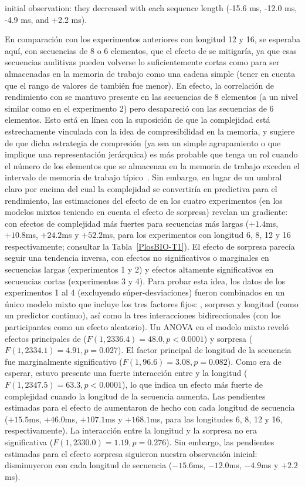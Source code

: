 initial observation: they decreased with each sequence length (-15.6 ms, -12.0 ms, -4.9 ms, and +2.2 ms).

En comparación con los experimentos anteriores con longitud 12 y 16, se esperaba aquí, con secuencias de 8 o 6 elementos, que el efecto de \mdlbin se mitigaría, ya que esas secuencias auditivas pueden volverse lo suficientemente cortas como para ser almacenadas en la memoria de trabajo como una cadena simple (tener en cuenta que el rango de valores de \mdlbin también fue menor). En efecto, la correlación de rendimiento con \mdlbin se mantuvo presente en las secuencias de 8 elementos (a un nivel similar como en el experimento 2) pero desapareció con las secuencias de 6 elementos. Esto está en línea con la suposición de que la complejidad está estrechamente vinculada con la idea de compresibilidad en la memoria, y sugiere de que dicha estrategia de compresión (ya sea un simple agrupamiento o que implique una representación jerárquica) es más probable que tenga un rol cuando el número de los elementos que se almacenan en la memoria de trabajo exceden el intervalo de memoria de trabajo típico~\cite{f16,f89}. Sin embargo, en lugar de un umbral claro por encima del cual la complejidad se convertiría en predictiva para el rendimiento, las estimaciones del efecto de \mdlbin en los cuatro experimentos (en los modelos mixtos teniendo en cuenta el efecto de sorpresa) revelan un gradiente: con efectos de complejidad más fuertes para secuencias más largas ($+1.4$ms, $+10.8$ms, $+24.2$ms y $+52.2$ms, para los experimentos con longitud 6, 8, 12 y 16 respectivamente; consultar la Tabla~\ref{PlosBIO-T1}). El efecto de sorpresa parecía seguir una tendencia inversa, con efectos no significativos o marginales en secuencias largas (experimentos 1 y 2) y efectos altamente significativos en secuencias cortas (experimentos 3 y 4). Para probar esta idea, los datos de los experimentos 1 al 4 (excluyendo súper-desviaciones) fueron combinados en un único modelo mixto que incluye los tres factores fijos: \mdlbin, sorpresa y longitud (como un predictor continuo), así como la tres interacciones bidireccionales (con los participantes como un efecto aleatorio). Un ANOVA en el modelo mixto reveló efectos principales de \mdlbin ($F (1, 2336.4) = 48.0, p < 0.0001$) y sorpresa ($F (1, 2334.1) = 4.91, p = 0.027$). El factor principal de longitud de la secuencia fue marginalmente significativo ($F (1, 96.6) = 3.08, p = 0.082$). Como era de esperar, estuvo presente una fuerte interacción entre \mdlbin y la longitud ($F (1, 2347.5) = 63.3, p < 0.0001$), lo que indica un efecto más fuerte de complejidad cuando la longitud de la secuencia aumenta. Las pendientes estimadas para el efecto de \mdlbin aumentaron de hecho con cada longitud de secuencia ($+15.5$ms, $+46.0$ms, $+107.1$ms y $+168.1$ms, para las longitudes 6, 8, 12 y 16, respectivamente). La interacción entre la longitud y la sorpresa no era significativa ($F (1, 2330.0) = 1.19, p = 0.276$). Sin embargo, las pendientes estimadas para el efecto sorpresa siguieron nuestra observación inicial: disminuyeron con cada longitud de secuencia ($-15.6$ms, $-12.0$ms, $-4.9$ms y $+ 2.2$ms).

